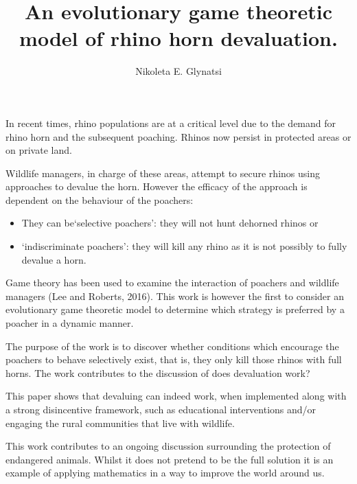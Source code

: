 \documentclass{article}
\title{An evolutionary game theoretic model of rhino horn devaluation.}
\date{}
\author{Nikoleta E. Glynatsi}
\begin{document}
\maketitle

In recent times, rhino populations are at a critical level due to the demand for rhino
horn and the subsequent poaching. Rhinos now persist in protected areas or on private
land.

Wildlife managers, in charge of these areas, attempt to secure rhinos using approaches
to devalue the horn. However the efficacy of the approach is dependent on the behaviour of the poachers:

\begin{itemize}
    \item They can be`selective poachers’: they will not hunt dehorned rhinos or
    \item `indiscriminate poachers’: they will kill any rhino as it is not
        possibly to fully devalue a horn.
\end{itemize}

Game theory has been used to examine the interaction of poachers and wildlife
managers (Lee and Roberts, 2016).
This work is however the first to consider an evolutionary game theoretic model to determine which
strategy is preferred by a poacher in a dynamic manner.

The purpose of the work is to discover whether conditions which encourage the poachers
to behave selectively exist, that is, they only kill those rhinos with full horns.
The work contributes to the discussion of does devaluation work?

This paper shows that devaluing can indeed work, when implemented along with a strong
disincentive framework, such as educational interventions and/or engaging the rural communities
that live with wildlife.

This work contributes to an ongoing discussion surrounding the protection of
endangered animals. Whilst it does not pretend to be the full solution it is an
example of applying mathematics in a way to improve the world around us.
\end{document}
